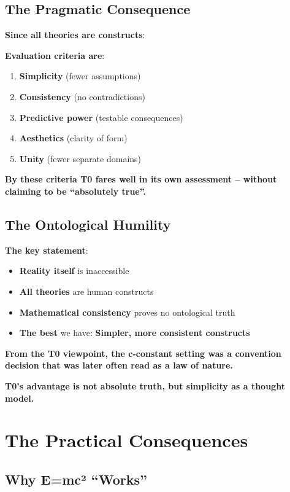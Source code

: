 	\subsection{The Pragmatic Consequence}
	
	\textbf{Since all theories are constructs}:
	
	\textbf{Evaluation criteria are}:
	\begin{enumerate}
		\item \textbf{Simplicity} (fewer assumptions)
		\item \textbf{Consistency} (no contradictions)
		\item \textbf{Predictive power} (testable consequences)
		\item \textbf{Aesthetics} (clarity of form)
		\item \textbf{Unity} (fewer separate domains)
	\end{enumerate}
	
	\textbf{By these criteria T0 fares well in its own assessment – without claiming to be ``absolutely true''.}
	
	\subsection{The Ontological Humility}
	
	\textbf{The key statement}:
	\begin{itemize}
		\item \textbf{Reality itself} is inaccessible
		\item \textbf{All theories} are human constructs
		\item \textbf{Mathematical consistency} proves no ontological truth
		\item \textbf{The best} we have: \textbf{Simpler, more consistent constructs}
	\end{itemize}
	
	\textbf{From the T0 viewpoint, the c-constant setting was a convention decision that was later often read as a law of nature.}
	
	\textbf{T0's advantage is not absolute truth, but simplicity as a thought model.}
	
	\section{The Practical Consequences}
	
	\subsection{Why E=mc² ``Works''}
	
